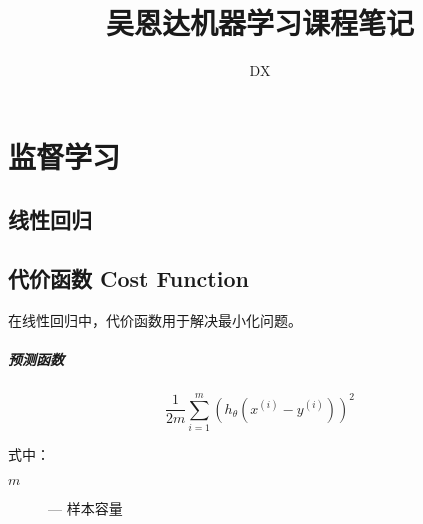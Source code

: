 \documentclass[11pt]{book}
\begin{document}
\title{吴恩达机器学习课程笔记}
\author{DX}
\maketitle

\chapter{监督学习}

\section{线性回归}

\section{代价函数 Cost Function}

在线性回归中，代价函数用于解决最小化问题。

\paragraph{预测函数}

$$
     \frac{1}{2m} \sum^{m}_{i=1} (h_\theta(x^{(i)} - y^{(i)}))^2
$$

式中：

\begin{description}
     \item[$m$] --- 样本容量
\end{description}
\end{document}
